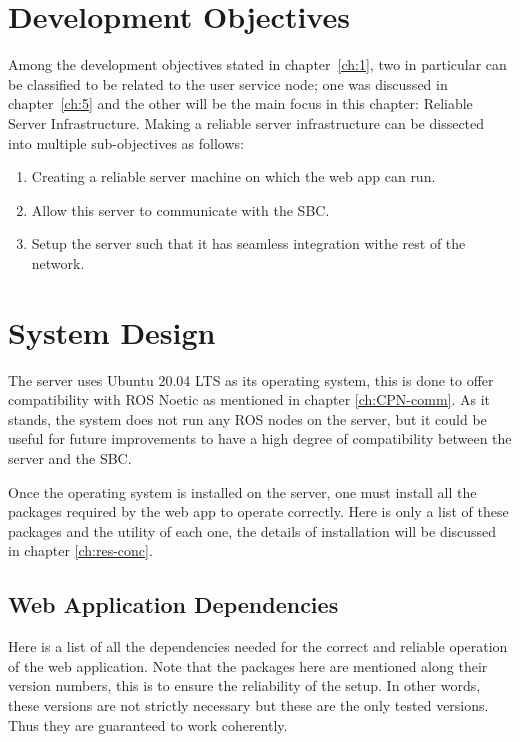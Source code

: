 \section{Development Objectives}
Among the development objectives stated in chapter~\ref{ch:1}, two in particular can be classified to be related to the user service node; one was discussed in chapter~\ref{ch:5} and the other will be the main focus in this chapter: Reliable Server Infrastructure. Making a reliable server infrastructure can be dissected into multiple sub-objectives as follows:
\begin{enumerate}
    \item Creating a reliable server machine on which the web app can run.
    \item Allow this server to communicate with the SBC.
    \item Setup the server such that it has seamless integration withe rest of the network.
\end{enumerate}



\section{System Design}
The server uses Ubuntu 20.04 LTS as its operating system, this is done to offer compatibility with ROS Noetic as mentioned in chapter \ref{ch:CPN-comm}. As it stands, the system does not run any ROS nodes on the server, but it could be useful for future improvements to have a high degree of compatibility between the server and the SBC.

Once the operating system is installed on the server, one must install all the packages required by the web app to operate correctly. Here is only a list of these packages and the utility of each one, the details of installation will be discussed in chapter \ref{ch:res-conc}.

\newpage
\subsection{Web Application Dependencies}
Here is a list of all the dependencies needed for the correct and reliable operation of the web application. Note that the packages here are mentioned along their version numbers, this is to ensure the reliability of the setup. In other words, these versions are not strictly necessary but these are the only tested versions. Thus they are guaranteed to work coherently.

